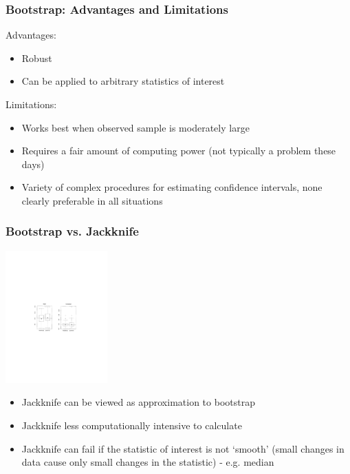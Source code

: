\documentclass{beamer}
\begin{document}

\begin{frame}
  \frametitle{Bootstrap: Advantages and Limitations}

Advantages:
\begin{itemize}
    \item Robust
    \item Can be applied to arbitrary statistics of interest
\end{itemize}

Limitations:
\begin{itemize}
    \item Works best when observed sample is moderately large
    \item Requires a fair amount of computing power (not typically a problem these days)
    \item Variety of complex procedures for estimating confidence intervals, none clearly preferable in all situations
\end{itemize}

\end{frame}

\begin{frame}
  \frametitle{Bootstrap vs. Jackknife}

\begin{center}
\includegraphics[height=2in]{jack-vs-boot}
\end{center}

\begin{itemize}
    \item Jackknife can be viewed as approximation to bootstrap
    \item Jackknife less computationally intensive to calculate
    \item Jackknife can fail if the statistic of interest is not `smooth' (small changes in data cause only small changes in the statistic) - e.g. median
\end{itemize}

\end{frame}
\end{document}
